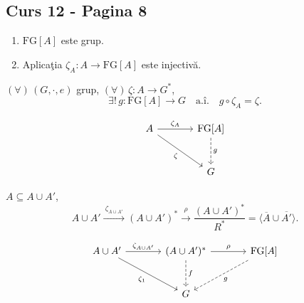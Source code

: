 
\subsection*{Curs 12 - Pagina 8}

\noindent{}
\begin{enumerate}
\item[(1)] $\mathrm{FG}[A]$ este grup.
\item[(2)] Aplica\c{t}ia $\zeta_A:A\longrightarrow\mathrm{FG}[A]$
este injectiv\u{a}.
\end{enumerate}

\medskip
\noindent $(\forall)\,(G,\cdot,e)$ grup,
$(\forall)\,\zeta:A\longrightarrow G^*$,
\[
\exists!\,g:\mathrm{FG}[A]\longrightarrow G
\quad\text{a.\^{i}.}\quad g\circ\zeta_A=\zeta.
\]

\[
\begin{tikzcd}[column sep=large, row sep=large]
A \arrow[r,"\zeta_A"] \arrow[dr,"\zeta"']
  & \mathrm{FG}[A] \arrow[d,dashed,"g"]\\
& G
\end{tikzcd}
\]

\medskip
\noindent $A\subseteq A\cup A'$,
\[
A\cup A'\xrightarrow{\ \zeta_{A\cup A'}\ }(A\cup A')^*
\xrightarrow{\ \rho\ }
\frac{(A\cup A')^*}{R^*}
=\langle\overline{A}\cup\overline{A'}\rangle.
\]

\[
\begin{tikzcd}[column sep=large, row sep=large]
A\cup A' \arrow[r,"\zeta_{A\cup A'}"] \arrow[dr,"\zeta_1"']
  & (A\cup A')^* \arrow[r,"\rho"] \arrow[d,dashed,"f"]
  & \mathrm{FG}[A] \arrow[dl,dashed,"g"]\\
& G &
\end{tikzcd}
\]

